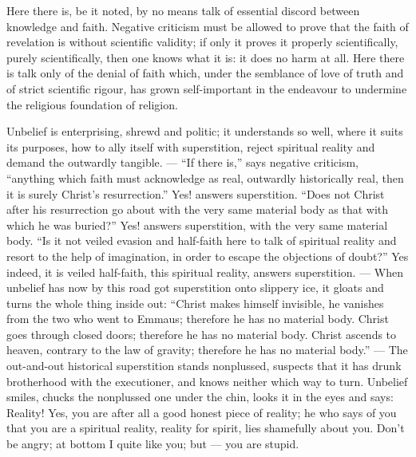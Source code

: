 \documentclass[12pt,a4paper,openany]{book}
\newcommand{\opage}[1]{\marginnote{\footnotesize\textit{[#1]}}}
\begin{document}
\setcounter{footnote}{0}%
\opage{70}Here there is, be it noted, by no means talk of essential
discord between knowledge and faith. Negative criticism must
be allowed to prove that the faith of revelation is without
scientific validity; if only it proves it properly
scientifically, purely scientifically, then one knows what
it is: it does no harm at all. Here there is talk only
of the denial of faith which, under the semblance of love of truth
and of strict scientific rigour, has grown
self-important in the endeavour to undermine
the religious foundation of religion.

Unbelief is enterprising, shrewd and politic; it understands
so well, where it suits its purposes, how to ally itself
with superstition, reject spiritual reality and demand the
outwardly tangible. --- ``If there is,'' says negative
criticism, ``anything which faith must acknowledge as real,
outwardly historically real, then it is surely Christ's
resurrection.'' Yes! answers superstition. ``Does not Christ
after his resurrection go about with the very same
material body as that with which he was buried?''
Yes! answers superstition, with the very same material
body. ``Is it not veiled evasion and half-faith
here to talk of spiritual reality and resort to the help of
imagination, in order to escape the objections of doubt?''
Yes indeed, it is veiled half-faith, this spiritual reality,
answers superstition. --- When unbelief has now by
this road got superstition onto slippery ice, it gloats
and turns the whole thing inside out: ``Christ makes himself
invisible, he vanishes from the two who went to Emmaus;
therefore he has no material body. Christ goes
through closed doors; therefore he has no material
body. Christ ascends to heaven, contrary to the law of
gravity; therefore he has no material body.'' --- The
\setcounter{footnote}{0}%
\opage{71}out-and-out historical superstition stands nonplussed, suspects that it has
drunk brotherhood with the executioner, and knows neither which way
to turn. Unbelief smiles, chucks the nonplussed one under
the chin, looks it in the eyes and says: Reality!
Yes, you are after all a good honest piece of reality; he
who says of you that you are a spiritual reality, reality
for spirit, lies shamefully about you. Don't
be angry; at bottom I quite like you; but ---
you are stupid.
\end{document}

